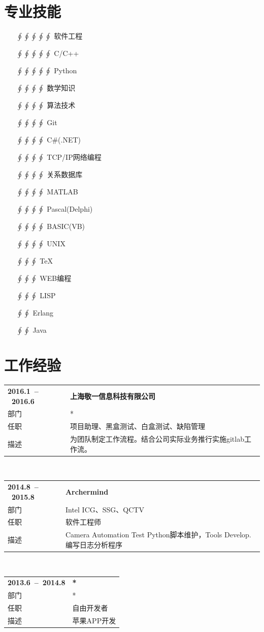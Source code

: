 \documentclass{resumecls}
\newlength{\TableWidth}\setlength{\TableWidth}{\textwidth}
\newcommand{\WorkExperience}[5]{
    \noindent
    \begin{tabularx}{\TableWidth}{>{\hsize=0.382\hsize}XX}
    \textbf{#1}  & \textbf{#2}\\
    部门         & #3\\
    任职         & #4\\
    描述         & #5
    \end{tabularx} \\
}
\begin{document}
\section{专业技能}
    \begin{multicols}{3}
    \begin{itemize}
      \item[$\oint\oint\oint\oint\oint$]软件工程
      \item[$\oint\oint\oint\oint\oint$]C/C++
      \item[$\oint\oint\oint\oint\oint$]Python
      \item[$\oint\oint\oint\oint$]数学知识
      \item[$\oint\oint\oint\oint$]算法技术
      \item[$\oint\oint\oint\oint$]Git
      \item[$\oint\oint\oint\oint$]C\#(.NET)
      \item[$\oint\oint\oint\oint$]TCP/IP网络编程
      \item[$\oint\oint\oint\oint$]关系数据库
      \item[$\oint\oint\oint\oint$]MATLAB
      \item[$\oint\oint\oint\oint$]Pascal(Delphi)
      \item[$\oint\oint\oint\oint$]BASIC(VB)
      \item[$\oint\oint\oint\oint$]UNIX
      \item[$\oint\oint\oint$]\TeX
      \item[$\oint\oint\oint$]WEB编程
      \item[$\oint\oint\oint$]LISP
      \item[$\oint\oint$]Erlang
      \item[$\oint\oint$]Java
    \end{itemize}
    \end{multicols}
\section{工作经验}
    \WorkExperience
        {2016.1~--~2016.6}
        {上海敬一信息科技有限公司}
        {*}
        {项目助理、黑盒测试、白盒测试、缺陷管理}
        {为团队制定工作流程。结合公司实际业务推行实施gitlab工作流。}
        
    \WorkExperience
        {2014.8~--~2015.8}
        {Archermind}
        {Intel ICG、SSG、QCTV}
        {软件工程师}
        {Camera Automation Test Python脚本维护，Tools Develop.编写日志分析程序}

    \WorkExperience
        {2013.6~--~2014.8}
        {*}
        {*}
        {自由开发者}
        {苹果APP开发}
\end{document}
